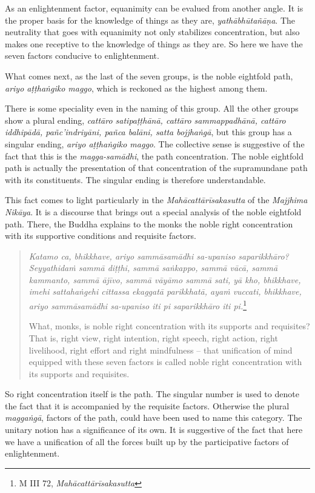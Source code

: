 \clearpage

As an enlightenment factor, equanimity can be evalued from another angle. It is the proper basis for the knowledge of things as they are, \emph{yathābhūtañāṇa}. The neutrality that goes with equanimity not only stabilizes concentration, but also makes one receptive to the knowledge of things as they are. So here we have the seven factors conducive to enlightenment.

What comes next, as the last of the seven groups, is the noble eightfold path, \emph{ariyo aṭṭhaṅgiko maggo}, which is reckoned as the highest among them.

There is some speciality even in the naming of this group. All the other groups show a plural ending, \emph{cattāro satipaṭṭhānā, cattāro sammappadhānā, cattāro iddhipādā, pañc'indriyāni, pañca balāni, satta bojjhaṅgā}, but this group has a singular ending, \emph{ariyo aṭṭhaṅgiko maggo}. The collective sense is suggestive of the fact that this is the \emph{magga-samādhi}, the path concentration. The noble eightfold path is actually the presentation of that concentration of the supramundane path with its constituents. The singular ending is therefore understandable.

This fact comes to light particularly in the \emph{Mahācattārīsakasutta} of the \emph{Majjhima Nikāya}. It is a discourse that brings out a special analysis of the noble eightfold path. There, the Buddha explains to the monks the noble right concentration with its supportive conditions and requisite factors.

\begin{quote}
\emph{Katamo ca, bhikkhave, ariyo sammāsamādhi sa-upaniso saparikkhāro? Seyyathidaṁ sammā diṭṭhi, sammā saṅkappo, sammā vācā, sammā kammanto, sammā ājīvo, sammā vāyāmo sammā sati, yā kho, bhikkhave, imehi sattahaṅgehi cittassa ekaggatā parikkhatā, ayaṁ vuccati, bhikkhave, ariyo sammāsamādhi sa-upaniso iti pi saparikkhāro iti pi.}\footnote{M III 72, \emph{Mahācattārīsakasutta}}

What, monks, is noble right concentration with its supports and requisites? That is, right view, right intention, right speech, right action, right livelihood, right effort and right mindfulness -- that unification of mind equipped with these seven factors is called noble right concentration with its supports and requisites.
\end{quote}

So right concentration itself is the path. The singular number is used to denote the fact that it is accompanied by the requisite factors. Otherwise the plural \emph{maggaṅgā}, factors of the path, could have been used to name this category. The unitary notion has a significance of its own. It is suggestive of the fact that here we have a unification of all the forces built up by the participative factors of enlightenment.

